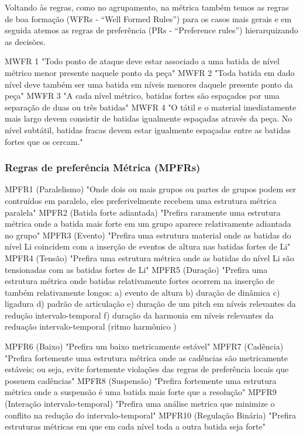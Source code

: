 \documentclass[
	12pt,				%
	openright,			%
	twoside,			%
	a4paper,			%
	english,			%
	french,				%
	spanish,			%
	brazil				%
	]{abntex2}
\begin{document}
Voltando às regras, como no agrupamento, na métrica também temos as regras de boa formação (WFRs - “Well Formed Rules”) para os casos mais gerais e em seguida atemos as regras de preferência (PRs - “Preference rules”) hierarquizando as decisões.

\begin{citacao}
MWFR 1 "Todo ponto de ataque deve estar associado a uma batida de nível métrico menor presente naquele ponto da peça" 
MWFR 2 "Toda batida em dado nível deve também ser uma batida em níveis menores daquele presente ponto da peça" 
MWFR 3 "A cada nível métrico, batidas fortes são espaçados por uma separação de duas ou três batidas" 
MWFR 4 "O tátil e o material imediatamente mais largo devem consistir de batidas igualmente espaçadas através da peça. No nível subtátil, batidas fracas devem estar igualmente espaçadas entre as batidas fortes que os cercam." 
 \cite{lerdahl1983generative}
\end{citacao} 

\subsubsection{Regras de preferência Métrica (MPFRs) } 

\begin{citacao}
MPFR1 (Paralelismo) "Onde dois ou mais grupos ou partes de grupos podem ser contruídos em paralelo, eles preferivelmente recebem uma estrutura métrica paralela" 
MPFR2 (Batida forte adiantada) "Prefira raramente uma estrutura métrica onde a batida mais forte em um grupo aparece relativamente adiantada no grupo" 
MPFR3 (Evento) "Prefira uma estrutura material onde as batidas do nível Li coincidem com a inserção de eventos de altura nas batidas fortes de Li" 
MPFR4 (Tensão) "Prefira uma estrutura métrica onde as batidas do nível Li são tensionadas com as batidas fortes de Li" 
MPFR5 (Duração) "Prefira uma estrutura métrica onde batidas relativamente fortes ocorrem na inserção de também relativamente longos: 
a) evento de altura 
b) duração de dinâmica 
c) ligadura 
d) padrão de articulação 
e) duração de um pitch em níveis relevantes da redução intervalo-temporal 
f) duração da harmonia em níveis relevantes  da reduação intervalo-temporal (ritmo harmônico )

MPFR6 (Baixo) "Prefira um baixo metricamente estável" 
MPFR7 (Cadência) "Prefira fortemente uma estrutura métrica onde as cadências são metricamente estáveis; ou seja, evite fortemente violações das regras de preferência locais que possuem cadências" 
MPFR8 (Suspensão) "Prefira fortemente uma estrutura métrica onde a suspensão é uma batida mais forte que a resolução" 
MPFR9 (Interação intervalo-temporal) "Prefira uma análise metrica que minimize o conflito na redução do intervalo-temporal" 
MPFR10 (Regulação Binária) "Prefira estruturas métricas em que em cada nível toda a outra batida seja forte" 
 \cite{lerdahl1983generative}
\end{citacao}
\end{document}
